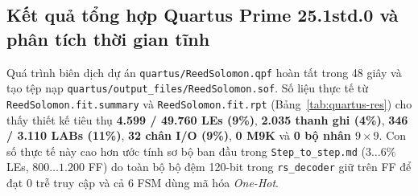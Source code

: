 \subsection*{Kết quả tổng hợp Quartus Prime 25.1std.0 và phân tích thời gian tĩnh}
Quá trình biên dịch dự án \texttt{quartus/ReedSolomon.qpf} hoàn tất trong 48 giây và tạo tệp nạp \texttt{quartus/output\_files/ReedSolomon.sof}. Số liệu thực tế từ \texttt{ReedSolomon.fit.summary} và \texttt{ReedSolomon.fit.rpt} (Bảng~\ref{tab:quartus-res}) cho thấy thiết kế tiêu thụ \textbf{4.599 / 49.760 LEs (9\%)}, \textbf{2.035 thanh ghi (4\%)}, \textbf{346 / 3.110 LABs (11\%)}, \textbf{32 chân I/O (9\%)}, \textbf{0 M9K} và \textbf{0 bộ nhân $9\times 9$}. Con số thực tế này cao hơn ước tính sơ bộ ban đầu trong \texttt{Step\_to\_step.md} ($3\dots 6\%$ LEs, $800\dots 1.200$ FF) do toàn bộ bộ đệm 120-bit trong \texttt{rs\_decoder} giữ trên FF để đạt 0 trễ truy cập và cả 6 FSM dùng mã hóa \textit{One-Hot}.

